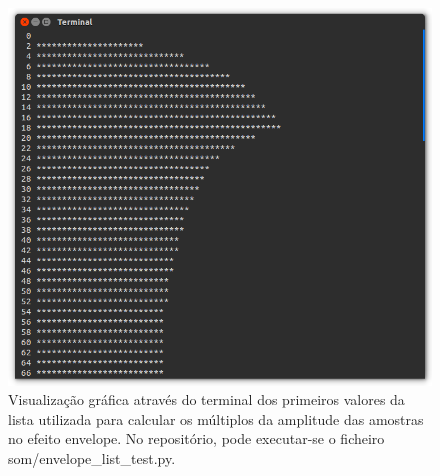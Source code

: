 \begin{figure}[htp]
\centering
\includegraphics[width=\textwidth]{images/envelopelist.png}
\caption{Visualização gráfica através do terminal dos primeiros valores da lista utilizada para calcular os múltiplos da amplitude das amostras no efeito envelope. No repositório, pode executar-se o ficheiro som/envelope\_list\_test.py.}
\label{envelopelist}
\end{figure}